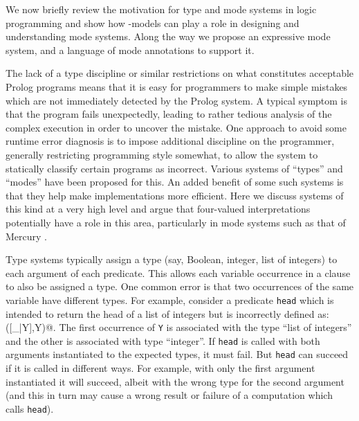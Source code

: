 \documentclass{tlp}
\begin{document}
We now briefly review the motivation for type and mode systems in logic
programming and show how -models can play a role
in designing and understanding mode systems.
Along the way we propose an expressive mode system, 
and a language of mode annotations to support it.

The lack of a type discipline or similar restrictions on what 
constitutes acceptable Prolog programs means that it is easy for 
programmers to make simple mistakes which
are not immediately detected by the Prolog system.  
A typical symptom
is that the program fails unexpectedly, leading to rather tedious analysis
of the complex execution in order to uncover the mistake.  
One approach to avoid
some runtime error diagnosis is to impose additional discipline on the
programmer, generally restricting programming style somewhat, 
to allow the system to statically classify certain programs as incorrect.
Various systems of ``types'' and ``modes'' have been proposed for this.
An added benefit of some such systems is that they help
make implementations more efficient.  
Here we discuss systems of this kind
at a very high level and argue that four-valued interpretations
potentially have a role in this area, particularly in mode systems such
as that of Mercury \cite{mercury}.

Type systems typically assign a type (say, Boolean, integer, list of
integers) to each argument of each predicate.  This allows each variable
occurrence in a clause to also be assigned a type.  One common error
is that two occurrences of the same variable have different types.
For example, consider a predicate \texttt{head} which is intended to
return the head of a list of integers but is incorrectly defined as:
\verb@head([_|Y],Y)@.  The first occurrence of \texttt{Y} is associated
with the type ``list of integers'' 
and the other is associated with type ``integer''.
If \texttt{head} is called with both arguments instantiated to the
expected types, it must fail.  But \texttt{head} can succeed if it
is called in different ways.  For example, with only the first argument
instantiated it will succeed, albeit with the wrong type for the second
argument (and this in turn may cause a wrong result or failure of a 
computation which calls \texttt{head}).
\end{document}
